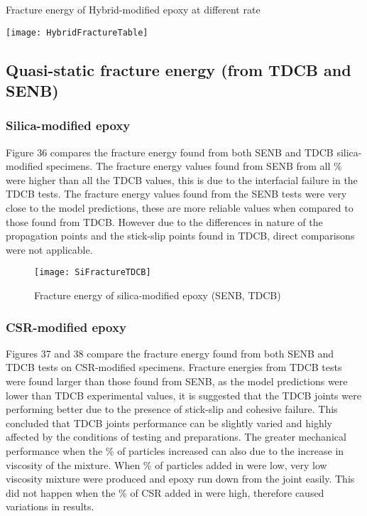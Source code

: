 \documentclass[numbers=noendperiod,chapterprefix=on]{icldt} %
\begin{document}
\begin{table}[!htpb]
\centering
\caption{Fracture energy of Hybrid-modified epoxy at different rate} %
\texttt{[image: HybridFractureTable]}
\end{table}

\subsection{Quasi-static fracture energy (from TDCB and SENB)}
\subsubsection{Silica-modified epoxy}
Figure 36 compares the fracture energy found from both SENB and TDCB silica-modified specimens. The fracture energy values found from SENB from all \% were higher than all the TDCB values, this is due to the interfacial failure in the TDCB tests. The fracture energy values found from the SENB tests were very close to the model predictions, these are more reliable values when compared to those found from TDCB. However due to the differences in nature of the propagation points and the stick-slip points found in TDCB, direct comparisons were not applicable. 

\begin{figure}[!htpb]
\centering
\texttt{[image: SiFractureTDCB]}
\caption{Fracture energy of silica-modified epoxy (SENB, TDCB) } %
\end{figure}

\subsubsection{CSR-modified epoxy}
Figures 37 and 38 compare the fracture energy found from both SENB and TDCB tests on CSR-modified specimens. Fracture energies from TDCB tests were found larger than those found from SENB, as the model predictions were lower than TDCB experimental values, it is suggested that the TDCB joints were performing better due to the presence of stick-slip and cohesive failure. This concluded that TDCB joints performance can be slightly varied and highly affected by the conditions of testing and preparations. The greater mechanical performance when the \% of particles increased can also due to the increase in viscosity of the mixture. When \% of particles added in were low, very low viscosity mixture were produced and epoxy run down from the joint easily. This did not happen when the \% of CSR added in were high, therefore caused variations in results.
\end{document}
